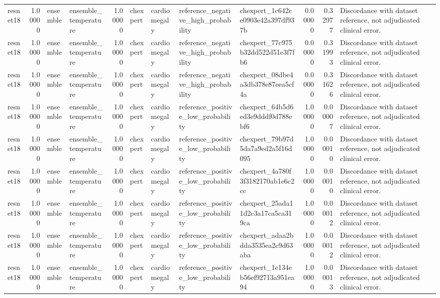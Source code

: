 \begin{tabular}{lrllrllllrrl}
resnet18 & 1.00000 & ensemble & ensemble\_temperature & 1.00000 & chexpert & cardiomegaly & reference\_negative\_high\_probability & chexpert\_1c642ce0903e42a397df937b & 0.00000 & 0.32977 & Discordance with dataset reference, not adjudicated clinical error. \\
resnet18 & 1.00000 & ensemble & ensemble\_temperature & 1.00000 & chexpert & cardiomegaly & reference\_negative\_high\_probability & chexpert\_77c975b32dd522d51e3f7fb6 & 0.00000 & 0.31993 & Discordance with dataset reference, not adjudicated clinical error. \\
resnet18 & 1.00000 & ensemble & ensemble\_temperature & 1.00000 & chexpert & cardiomegaly & reference\_negative\_high\_probability & chexpert\_08dbe4a3db378e87eea5cf4a & 0.00000 & 0.31626 & Discordance with dataset reference, not adjudicated clinical error. \\
resnet18 & 1.00000 & ensemble & ensemble\_temperature & 1.00000 & chexpert & cardiomegaly & reference\_positive\_low\_probability & chexpert\_64b5d6ed3e9dddf0d788ebf6 & 1.00000 & 0.00007 & Discordance with dataset reference, not adjudicated clinical error. \\
resnet18 & 1.00000 & ensemble & ensemble\_temperature & 1.00000 & chexpert & cardiomegaly & reference\_positive\_low\_probability & chexpert\_79b97d5da7a9ed2a5f16d095 & 1.00000 & 0.00010 & Discordance with dataset reference, not adjudicated clinical error. \\
resnet18 & 1.00000 & ensemble & ensemble\_temperature & 1.00000 & chexpert & cardiomegaly & reference\_positive\_low\_probability & chexpert\_4a780f3f3182170ab1e6c2cc & 1.00000 & 0.00010 & Discordance with dataset reference, not adjudicated clinical error. \\
resnet18 & 1.00000 & ensemble & ensemble\_temperature & 1.00000 & chexpert & cardiomegaly & reference\_positive\_low\_probability & chexpert\_25ada11d2c3a17ca5ca319ca & 1.00000 & 0.00012 & Discordance with dataset reference, not adjudicated clinical error. \\
resnet18 & 1.00000 & ensemble & ensemble\_temperature & 1.00000 & chexpert & cardiomegaly & reference\_positive\_low\_probability & chexpert\_adaa2bdda3535ea2c9d63aba & 1.00000 & 0.00012 & Discordance with dataset reference, not adjudicated clinical error. \\
resnet18 & 1.00000 & ensemble & ensemble\_temperature & 1.00000 & chexpert & cardiomegaly & reference\_positive\_low\_probability & chexpert\_1e134eb56ef92713a951ea94 & 1.00000 & 0.00013 & Discordance with dataset reference, not adjudicated clinical error. \\

\end{tabular}
